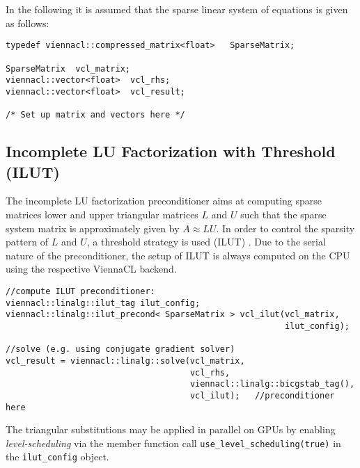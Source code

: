 In the following it is assumed that the sparse linear system of equations is given as follows:
\begin{lstlisting}
typedef viennacl::compressed_matrix<float>   SparseMatrix;

SparseMatrix  vcl_matrix;
viennacl::vector<float>  vcl_rhs;
viennacl::vector<float>  vcl_result;

/* Set up matrix and vectors here */
\end{lstlisting}


\subsection{Incomplete LU Factorization with Threshold (ILUT)}
The incomplete LU factorization preconditioner aims at computing sparse matrices lower and upper triangular matrices $L$ and $U$ such that the sparse system
matrix is approximately given by $A \approx LU$. In order to control the sparsity pattern of $L$ and $U$, a threshold strategy is used (ILUT)
\cite{saad-iterative-solution}. Due to the serial nature of the preconditioner, the setup of ILUT is always computed on
the CPU using the respective ViennaCL backend.

\begin{lstlisting}
//compute ILUT preconditioner:
viennacl::linalg::ilut_tag ilut_config;
viennacl::linalg::ilut_precond< SparseMatrix > vcl_ilut(vcl_matrix,
                                                        ilut_config);

//solve (e.g. using conjugate gradient solver)
vcl_result = viennacl::linalg::solve(vcl_matrix,
                                     vcl_rhs,
                                     viennacl::linalg::bicgstab_tag(),
                                     vcl_ilut);   //preconditioner here
\end{lstlisting}
The triangular substitutions may be applied in parallel on GPUs by enabling \emph{level-scheduling} \cite{saad-iterative-solution} via the member function call \lstinline|use_level_scheduling(true)| in the \lstinline|ilut_config| object.

